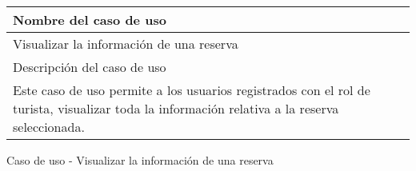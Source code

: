 \begin{identificacionCasoDeUso}
	\begin{tabular} { | p{17cm} |}
		\hline
		Nombre del caso de uso                                                                                                                        \\ \hline
		Visualizar la información de una reserva                                                                                                      \\ \hline
		Descripción del caso de uso                                                                                                                   \\ \hline
		Este caso de uso permite a los usuarios registrados con el rol de turista, visualizar toda la información relativa a la reserva seleccionada. \\ \hline
	\end{tabular}
	\caption{Caso de uso - Visualizar la información de una reserva}
\end{identificacionCasoDeUso}
